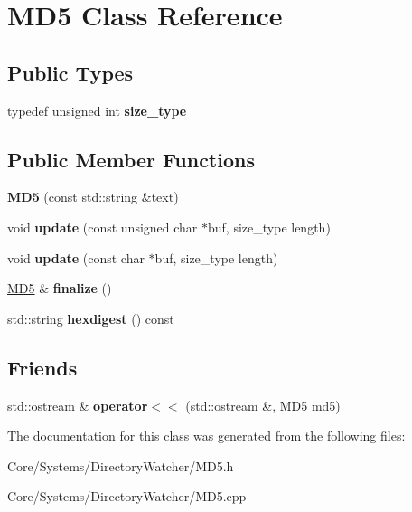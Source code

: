 \hypertarget{classMD5}{\section{M\-D5 Class Reference}
\label{classMD5}
}
\subsection*{Public Types}
\begin{DoxyCompactItemize}
\item 
\hypertarget{classMD5_aa836972700679dbcff6ae8337f6db464}{typedef unsigned int {\bfseries size\-\_\-type}}\label{classMD5_aa836972700679dbcff6ae8337f6db464}

\end{DoxyCompactItemize}
\subsection*{Public Member Functions}
\begin{DoxyCompactItemize}
\item 
\hypertarget{classMD5_a155356ffd713345e69e6dcbd9f8da6ce}{{\bfseries M\-D5} (const std\-::string \&text)}\label{classMD5_a155356ffd713345e69e6dcbd9f8da6ce}

\item 
\hypertarget{classMD5_ac5ddf6cd8f940422396d321ea90ed045}{void {\bfseries update} (const unsigned char $\ast$buf, size\-\_\-type length)}\label{classMD5_ac5ddf6cd8f940422396d321ea90ed045}

\item 
\hypertarget{classMD5_ac5ccba375539b993958fb235f8ac849c}{void {\bfseries update} (const char $\ast$buf, size\-\_\-type length)}\label{classMD5_ac5ccba375539b993958fb235f8ac849c}

\item 
\hypertarget{classMD5_a10f607494a3f2e3e515fc4b99d1a06cc}{\hyperlink{classMD5}{M\-D5} \& {\bfseries finalize} ()}\label{classMD5_a10f607494a3f2e3e515fc4b99d1a06cc}

\item 
\hypertarget{classMD5_ad36c65acf87e397bf717bc3defbc0c7a}{std\-::string {\bfseries hexdigest} () const }\label{classMD5_ad36c65acf87e397bf717bc3defbc0c7a}

\end{DoxyCompactItemize}
\subsection*{Friends}
\begin{DoxyCompactItemize}
\item 
\hypertarget{classMD5_a0739666fd0f3a7117546f6c50e0783b2}{std\-::ostream \& {\bfseries operator$<$$<$} (std\-::ostream \&, \hyperlink{classMD5}{M\-D5} md5)}\label{classMD5_a0739666fd0f3a7117546f6c50e0783b2}

\end{DoxyCompactItemize}


The documentation for this class was generated from the following files\-:\begin{DoxyCompactItemize}
\item 
Core/\-Systems/\-Directory\-Watcher/M\-D5.\-h\item 
Core/\-Systems/\-Directory\-Watcher/M\-D5.\-cpp\end{DoxyCompactItemize}
